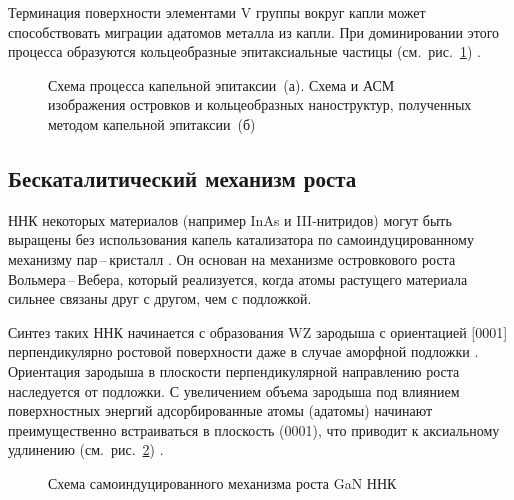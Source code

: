 Терминация поверхности элементами V группы вокруг капли может способствовать
миграции адатомов металла из капли. При доминировании этого процесса образуются
кольцеобразные эпитаксиальные частицы (см.~рис.~\cref{fig:Image_8_3})
\cite{Gurioli2019, mano2005}.

\begin{figure}[ht]  \caption{Схема
процесса капельной эпитаксии~(а). Схема и АСМ изображения островков и
кольцеобразных наноструктур, полученных методом капельной эпитаксии~(б)
\cite{Gurioli2019}}\label{fig:Image_8_3} \end{figure}

\subsection{Бескаталитический механизм роста}\label{subsec:ch1/sec2/sub7}

ННК некоторых материалов (например InAs и III-нитридов) могут быть выращены без
использования капель катализатора по самоиндуцированному механизму
пар\,--\,кристалл \cite{Ristic2008, Bolshakov2014}. Он основан на механизме
островкового роста Вольмера\,--\,Вебера, который реализуется, когда атомы
растущего материала сильнее связаны друг с другом, чем с подложкой.

Синтез таких ННК начинается с образования WZ зародыша с ориентацией [0001]
перпендикулярно ростовой поверхности даже в случае аморфной подложки
\cite{Stoica2008, Corfdir2009}. Ориентация зародыша в плоскости
перпендикулярной направлению роста наследуется от подложки. С увеличением
объема зародыша под влиянием поверхностных энергий адсорбированные атомы
(адатомы) начинают преимущественно встраиваться в плоскость (0001), что
приводит к аксиальному удлинению (см.~рис.~\cref{fig:Image_9})
\cite{Dubrovskii2012b}.

\begin{figure}[ht]  \caption{Схема самоиндуцированного механизма роста GaN ННК
\cite{Dubrovskii2012b}}\label{fig:Image_9} \end{figure}

\FloatBarrier
